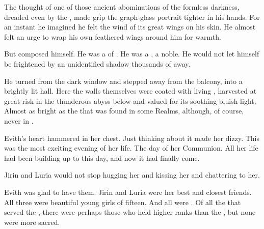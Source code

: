 
The thought of one of those ancient abominations of the formless darkness, dreaded even by the \resphain, made \Teshrial grip the graph-glass portrait tighter in his hands. 
For an instant he imagined he felt the wind of its great wings on his skin. 
He almost felt an urge to wrap his own feathered wings around him for warmth. 

But \Teshrial composed himself.
He was a \resphan of \CiriathSepher. 
He was a \ketheran, a noble. 
He would not let himself be frightened by an unidentified shadow thousands of \metres away. 


He turned from the dark window and stepped away from the balcony, into a brightly lit hall. 
Here the walls themselves were coated with living \glowmoss, harvested at great risk in the thunderous abyss below and valued for its soothing bluish light. 
Almost as bright as the   that was found in some Realms, although, of course, never in \Nyx. 




\begin{comment}
  \subsection{Evith}
\end{comment}
\new
{}

Evith's heart hammered in her chest. 
Just thinking about it made her dizzy. 
This was the most exciting evening of her life. 
The day of her Communion. 
All her life had been building up to this day, and now it had finally come. 

Jirin and Luria would not stop hugging her and kissing her and chattering to her.

Evith was glad to have them. 
Jirin and Luria were her best and closest friends. 
All three were beautiful young girls of fifteen. 
And all were \naorim. 
Of all the \humans that served the \resphain, there were perhaps those who held higher ranks than the \naorim, but none were more sacred. 

